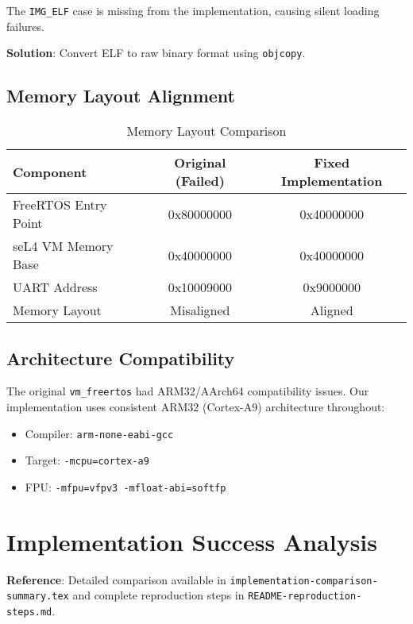 \documentclass[12pt]{article}
\begin{document}
The \texttt{IMG\_ELF} case is missing from the implementation, causing silent loading failures.

\textbf{Solution}: Convert ELF to raw binary format using \texttt{objcopy}.

\subsection{Memory Layout Alignment}

\begin{table}[h!]
\centering
\begin{tabular}{@{}lcc@{}}
\toprule
\textbf{Component} & \textbf{Original (Failed)} & \textbf{Fixed Implementation} \\
\midrule
FreeRTOS Entry Point & 0x80000000 & 0x40000000 \\
seL4 VM Memory Base & 0x40000000 & 0x40000000 \\
UART Address & 0x10009000 & 0x9000000 \\
Memory Layout & Misaligned & Aligned \\
\bottomrule
\end{tabular}
\caption{Memory Layout Comparison}
\end{table}

\subsection{Architecture Compatibility}

The original \texttt{vm\_freertos} had ARM32/AArch64 compatibility issues. Our implementation uses consistent ARM32 (Cortex-A9) architecture throughout:

\begin{itemize}
\item Compiler: \texttt{arm-none-eabi-gcc}
\item Target: \texttt{-mcpu=cortex-a9}
\item FPU: \texttt{-mfpu=vfpv3 -mfloat-abi=softfp}
\end{itemize}

\section{Implementation Success Analysis}

\textbf{Reference}: Detailed comparison available in \texttt{implementation-comparison-summary.tex} and complete reproduction steps in \texttt{README-reproduction-steps.md}.
\end{document}
